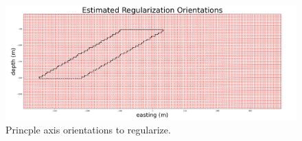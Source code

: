 \begin{figure}[htb]
    \vspace{-0.1cm}
    \begin{center}
    \includegraphics[width=\columnwidth]{figures/principle_axes.png}
    \end{center}
    \vspace{-0.5cm}
\caption{
    Princple axis orientations to regularize.
}
\label{fig:principle_axes}
\vspace{-0.1cm}
\end{figure}
